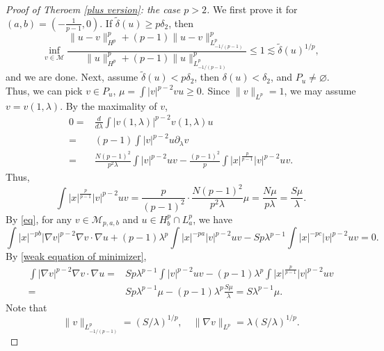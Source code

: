 \documentclass[11pt]{article}
\numberwithin{equation}{section}
\begin{document}
\begin{proof}[Proof of Theroem \ref{plus version}: the case $p>2$]
    We first prove it for $(a,b) = (-\frac{1}{p-1},0)$.
    If $\tilde{\delta}(u) \ge p\delta_2$, then
    \begin{equation*}
        \inf_{v\in \mathcal{M}} \frac{ \|u-v\|_{H^p}^p + (p-1)\|u-v\|_{L^p_{-1/(p-1)}}^p }{\|u\|_{H^p}^p+(p-1)\|u\|_{L^p_{-1/(p-1)}}^p} \le 1 \lesssim \tilde{\delta}(u)^{1/p},
    \end{equation*}
    and we are done. Next, assume $\tilde{\delta}(u)<p\delta_2$, then $\delta(u) < \delta_2$, and $P_u\neq\varnothing$. Thus, we can pick $v\in P_u$, $\mu = \int |v|^{p-2}vu\ge 0$. Since $\|v\|_{L^p}=1$, we may assume $v=v(1,\lambda)$. By the maximality of $v$,
    \begin{align*}
        0 ={}& \frac{d}{d\lambda} \int |v(1,\lambda)|^{p-2}v(1,\lambda)u\\
        ={}& (p-1) \int |v|^{p-2}u\partial_\lambda v \\
        ={}& \frac{N(p-1)^2}{p^2\lambda}\int |v|^{p-2}uv - \frac{(p-1)^2}{p}\int |x|^{\frac{p}{p-1}} |v|^{p-2} uv.
    \end{align*}
    Thus,
    \begin{equation}\label{a norm}
        \int |x|^{\frac{p}{p-1}}|v|^{p-2}uv = \frac{p}{(p-1)^2}\cdot \frac{N(p-1)^2}{p^2\lambda}\mu = \frac{N\mu}{p\lambda} = \frac{S\mu}{\lambda}.
    \end{equation}
    By \eqref{eq}, for any $v\in \mathcal{M}_{p,a,b}$ and $u\in H_b^p\cap L_a^p$, we have
    \begin{equation}\label{weak equation of minimizer}
        \int |x|^{-pb}|\nabla v|^{p-2}\nabla v\cdot \nabla u + (p-1)\lambda^p\int |x|^{-pa}|v|^{p-2}uv - Sp\lambda^{p-1}\int |x|^{-pc}|v|^{p-2}uv = 0.
    \end{equation}
    By \eqref{weak equation of minimizer},
    \begin{equation}\label{b norm}
        \begin{split}
            \int |\nabla v|^{p-2}\nabla v \cdot \nabla u ={}& Sp\lambda^{p-1}\int |v|^{p-2}uv - (p-1)\lambda^p\int|x|^{\frac{p}{p-1}}|v|^{p-2}uv \\
            ={}& Sp\lambda^{p-1}\mu - (p-1)\lambda^p \frac{S\mu}{\lambda} = S\lambda^{p-1}\mu.
        \end{split}
    \end{equation}
    Note that
    \begin{equation*}
        \|v\|_{L^p_{-1/(p-1)}} = (S/\lambda)^{1/p}, \quad \|\nabla v\|_{L^p} = \lambda(S/\lambda)^{1/p}.

\end{equation*}
\end{proof}
\end{document}
